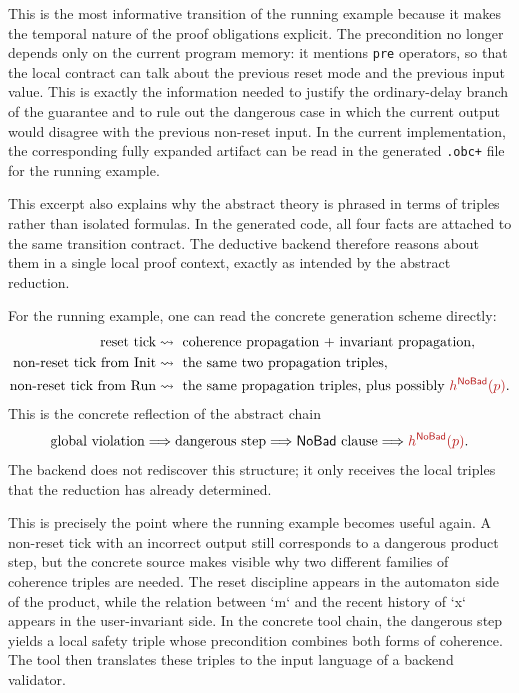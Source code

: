 \documentclass[acmsmall,screen]{acmart}
\theoremstyle{leftplain}
\theoremstyle{leftdefinition}
\theoremstyle{leftremark}
\begin{document}
This is the most informative transition of the running example because it makes
the temporal nature of the proof obligations explicit. The precondition no
longer depends only on the current program memory: it mentions \texttt{pre}
operators, so that the local contract can talk about the previous reset mode
and the previous input value. This is exactly the information needed to justify
the ordinary-delay branch of the guarantee and to rule out the dangerous case
in which the current output would disagree with the previous non-reset input.
In the current implementation, the corresponding fully expanded artifact can be
read in the generated \texttt{.obc+} file for the running example.

This excerpt also explains why the abstract theory is phrased in terms of
triples rather than isolated formulas. In the generated code, all four facts
are attached to the same transition contract. The deductive backend therefore
reasons about them in a single local proof context, exactly as intended by the
abstract reduction.

For the running example, one can read the concrete generation scheme directly:
\[
\begin{aligned}
\text{reset tick} &\leadsto \text{ coherence propagation + invariant propagation},\\
\text{non-reset tick from Init} &\leadsto \text{ the same two propagation triples},\\
\text{non-reset tick from Run} &\leadsto \text{ the same propagation triples, plus possibly } \triplesafe{h^{\NoBad}(p)}.
\end{aligned}
\]
This is the concrete reflection of the abstract chain
\[
\text{global violation} \Longrightarrow \text{dangerous step}
\Longrightarrow \NoBad\text{ clause} \Longrightarrow \triplesafe{h^{\NoBad}(p)}.
\]
The backend does not rediscover this structure; it only receives the local
triples that the reduction has already determined.

This is precisely the point where the running example becomes useful again. A
non-reset tick with an incorrect output still corresponds to a dangerous
product step, but the concrete source makes visible why two different families
of coherence triples are needed. The reset discipline appears in the automaton
side of the product, while the relation between `m` and the recent history of
`x` appears in the user-invariant side. In the concrete tool chain, the
dangerous step yields a local safety triple whose precondition combines both
forms of coherence. The tool then translates these triples to the input
language of a backend validator.
\end{document}
